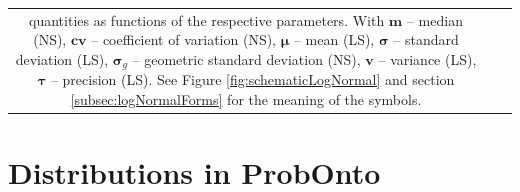 {\begin{center}
\begin{longtable}{ccc}
{quantities as functions of the respective parameters. With $\boldsymbol m$ -- median (NS), 
$\boldsymbol {cv}$ -- coefficient of variation (NS), $\boldsymbol \mu$ -- mean (LS), 
$\boldsymbol \sigma$ -- standard deviation (LS), $\boldsymbol \sigma_g$ -- geometric standard 
deviation (NS), $\boldsymbol v$ -- variance (LS), 
$\boldsymbol \tau$ -- precision (LS). See Figure \ref{fig:schematicLogNormal} and 
section \ref{subsec:logNormalForms} for the meaning of the symbols.
}
\label{figTable:logNormalParameterisations}
\vspace{-2.5em}
\end{longtable}
\end{center}

\section{Distributions in ProbOnto}
}
